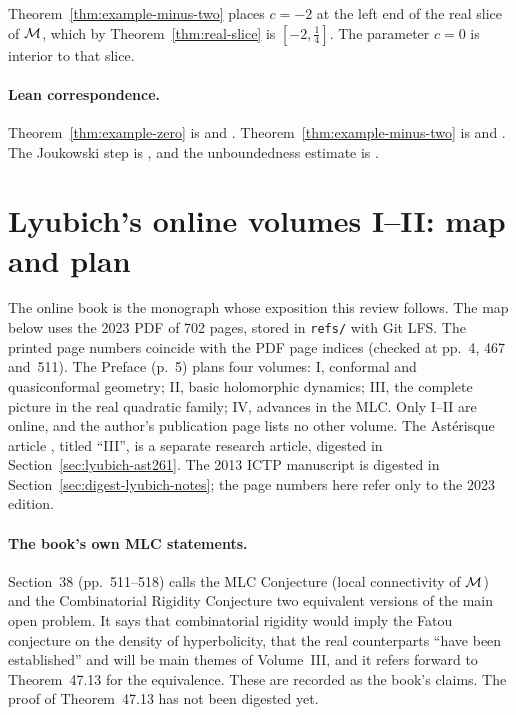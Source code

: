 \begin{remark}
Theorem~\ref{thm:example-minus-two} places $c=-2$ at the left end of the real slice of
$\mathcal M$, which by Theorem~\ref{thm:real-slice} is $[-2,\tfrac14]$.  The parameter $c=0$ is
interior to that slice.
\end{remark}

\paragraph{Lean correspondence.}
Theorem~\ref{thm:example-zero} is
 and
.  Theorem~\ref{thm:example-minus-two} is
 and
.  The Joukowski step is
, and the
unboundedness estimate is .

\section{Lyubich's online volumes I--II: map and plan}
\label{sec:lyubich-volumes-map}

The online book \cite{LyubichBook} is the monograph whose exposition this review follows.  The map below
uses the 2023 PDF of 702 pages, stored in \texttt{refs/} with Git LFS.  The printed
page numbers coincide with the PDF page indices (checked at pp.~4, 467 and~511).  The Preface (p.~5) plans four
volumes: I, conformal and quasiconformal geometry; II, basic holomorphic dynamics; III, the complete picture
in the real quadratic family; IV, advances in the MLC.  Only I--II are online, and the author's publication
page lists no other volume.  The Astérisque article \cite{LyubichIII}, titled ``III'', is a separate research
article, digested in Section~\ref{sec:lyubich-ast261}.  The 2013 ICTP manuscript is digested in
Section~\ref{sec:digest-lyubich-notes}; the page numbers here refer only to the 2023 edition.

\paragraph{The book's own MLC statements.}
Section~38 (pp.~511--518) calls the MLC Conjecture (local connectivity of $\mathcal M$) and the Combinatorial Rigidity
Conjecture two equivalent versions of the main open problem.  It says that combinatorial rigidity would imply
the Fatou conjecture on the density of hyperbolicity, that the real counterparts ``have been established'' and
will be main themes of Volume~III, and it refers forward to Theorem~47.13 for the equivalence.  These are
recorded as the book's claims.  The proof of Theorem~47.13 has not been digested yet.

